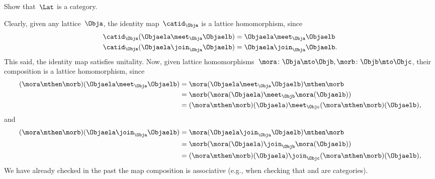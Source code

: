 \begin{exercise}
	\label{ex:lat_is_cat}
	Show that~$\Lat$ is a category.
\end{exercise}
\begin{solution}
	Clearly, given any lattice~$\Obja$, the identity map~$\catid_\Obja$ is a lattice homomorphism, since
	\begin{equation*}
		\begin{aligned}
			\catid_\Obja(\Objaela \meet_\Obja \Objaelb) & =\Objaela \meet_\Obja \Objaelb  \\
			\catid_\Obja(\Objaela \join_\Obja \Objaelb) & =\Objaela \join_\Obja \Objaelb.
		\end{aligned}
	\end{equation*}
	This said, the identity map satisfies unitality.
	Now, given lattice homomorphisms~$\mora\colon \Obja \mto \Objb, \morb\colon \Objb\mto \Objc$, their composition is a lattice homomorphism, since
	\begin{equation*}
		\begin{aligned}
			(\mora \mthen \morb)(\Objaela \meet_\Obja \Objaelb) & = \mora(\Objaela \meet_\Obja \Objaelb) \mthen \morb                         \\
			                                                    & = \morb(\mora(\Objaela) \meet_\Objb \mora(\Objaelb))                        \\
			                                                    & =(\mora \mthen \morb)(\Objaela) \meet_\Objc (\mora \mthen \morb)(\Objaelb),
		\end{aligned}
	\end{equation*}
	and
	\begin{equation*}
		\begin{aligned}
			(\mora \mthen \morb)(\Objaela \join_\Obja \Objaelb) & = \mora(\Objaela \join_\Obja \Objaelb) \mthen \morb                         \\
			                                                    & = \morb(\mora(\Objaela) \join_\Objb \mora(\Objaelb))                        \\
			                                                    & =(\mora \mthen \morb)(\Objaela) \join_\Objc (\mora \mthen \morb)(\Objaelb),
		\end{aligned}
	\end{equation*}
	We have already checked in the past the map composition is associative (e.g., when checking that \Set and \Pos are categories).
\end{solution}

